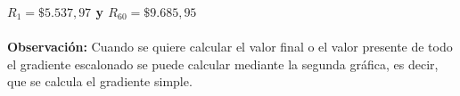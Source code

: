 \begin{itemize}
	\textbf{	$R_{1} = \$5.537,97$ y $R_{60} = \$9.685,95$}\\\\
		\textbf{Observación:} Cuando se quiere calcular el valor final o el valor presente de todo el gradiente escalonado se puede calcular mediante la segunda gráfica, es decir, que se calcula el gradiente simple.
		
	\end{itemize}
	
	
	
	
	
	
	
	
	
	
	
	
	
	
	
	
	
	\cleardoublepage
	\setlength{\columnsep}{0.75cm}
	\printindex
	
